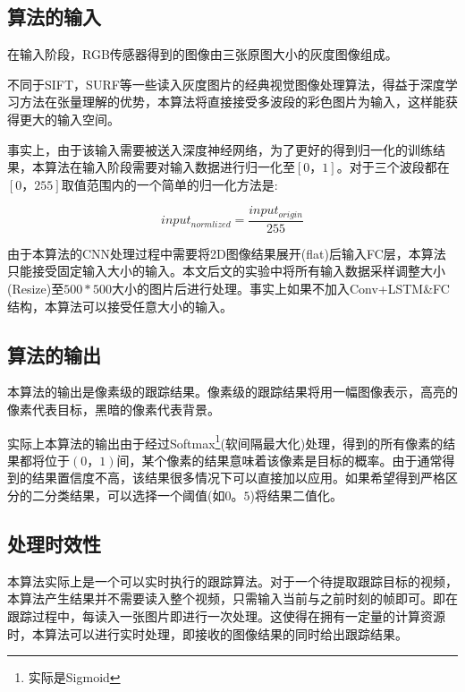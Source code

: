 \subsection{算法的输入} \label{section:input_of_our_algorithm}
\par
在输入阶段，RGB传感器得到的图像由三张原图大小的灰度图像组成。
\par
不同于SIFT\supercite{lowe1999object}，SURF\supercite{bay2006surf}等一些读入灰度图片的经典视觉图像处理算法，得益于深度学习方法在张量理解的优势，本算法将直接接受多波段的彩色图片为输入，这样能获得更大的输入空间。
\par
事实上，由于该输入需要被送入深度神经网络，为了更好的得到归一化的训练结果，本算法在输入阶段需要对输入数据进行归一化至$[0，1]$。对于三个波段都在$[0，255]$取值范围内的一个简单的归一化方法是:
\par
\begin{equation}\label{equ:input_norm}  input_{normlized} = \frac{input_{origin}}{255}  \end{equation}
\par
由于本算法的CNN处理过程中需要将2D图像结果展开(flat)后输入FC层，本算法只能接受固定输入大小的输入。本文后文的实验中将所有输入数据采样调整大小(Resize)至$500*500$大小的图片后进行处理。事实上如果不加入Conv+LSTM\&FC结构，本算法可以接受任意大小的输入。
\par

\subsection{算法的输出}
本算法的输出是像素级的跟踪结果。像素级的跟踪结果将用一幅图像表示，高亮的像素代表目标，黑暗的像素代表背景。
\par
实际上本算法的输出由于经过Softmax\footnote{实际是Sigmoid}(软间隔最大化)处理，得到的所有像素的结果都将位于$(0，1)$间，某个像素的结果意味着该像素是目标的概率。由于通常得到的结果置信度不高，该结果很多情况下可以直接加以应用。如果希望得到严格区分的二分类结果，可以选择一个阈值(如$0。5$)将结果二值化。

\subsection{处理时效性}
本算法实际上是一个可以实时执行的跟踪算法。对于一个待提取跟踪目标的视频，本算法产生结果并不需要读入整个视频，只需输入当前与之前时刻的帧即可。即在跟踪过程中，每读入一张图片即进行一次处理。这使得在拥有一定量的计算资源时，本算法可以进行实时处理，即接收的图像结果的同时给出跟踪结果。

